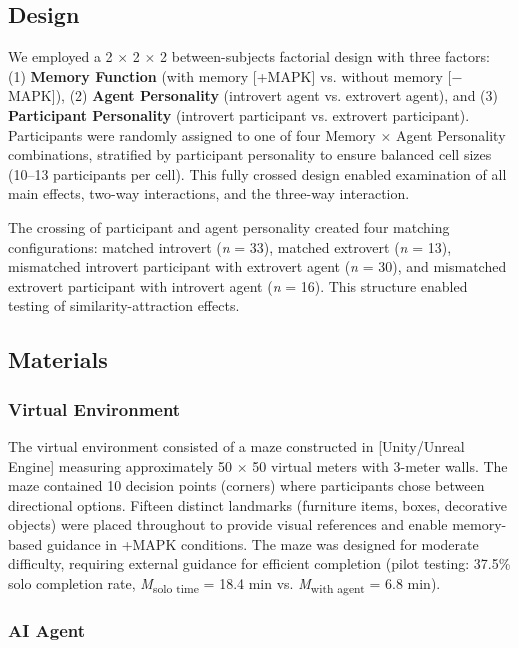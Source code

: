 \documentclass[12pt]{article}
\begin{document}
\subsection{Design}

We employed a 2 $\times$ 2 $\times$ 2 between-subjects factorial design with three factors: (1) \textbf{Memory Function} (with memory [+MAPK] vs. without memory [$-$MAPK]), (2) \textbf{Agent Personality} (introvert agent vs. extrovert agent), and (3) \textbf{Participant Personality} (introvert participant vs. extrovert participant). Participants were randomly assigned to one of four Memory $\times$ Agent Personality combinations, stratified by participant personality to ensure balanced cell sizes (10--13 participants per cell). This fully crossed design enabled examination of all main effects, two-way interactions, and the three-way interaction.

The crossing of participant and agent personality created four matching configurations: matched introvert (\textit{n} = 33), matched extrovert (\textit{n} = 13), mismatched introvert participant with extrovert agent (\textit{n} = 30), and mismatched extrovert participant with introvert agent (\textit{n} = 16). This structure enabled testing of similarity-attraction effects.

\subsection{Materials}

\subsubsection{Virtual Environment}

The virtual environment consisted of a maze constructed in [Unity/Unreal Engine] measuring approximately 50 $\times$ 50 virtual meters with 3-meter walls. The maze contained 10 decision points (corners) where participants chose between directional options. Fifteen distinct landmarks (furniture items, boxes, decorative objects) were placed throughout to provide visual references and enable memory-based guidance in +MAPK conditions. The maze was designed for moderate difficulty, requiring external guidance for efficient completion (pilot testing: 37.5\% solo completion rate, \textit{M}\textsubscript{solo time} = 18.4 min vs. \textit{M}\textsubscript{with agent} = 6.8 min).

\subsubsection{AI Agent}
\end{document}
